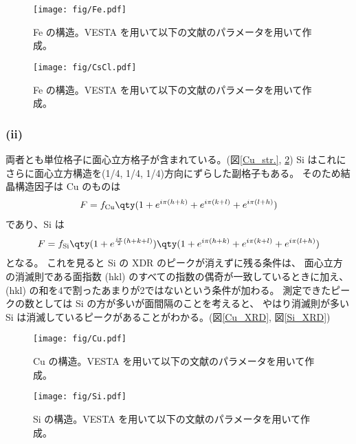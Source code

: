 \documentclass[11pt,dvipdfmx,a4paper]{jsarticle}
\begin{document}
\begin{figure}[H]
	\centering
	\begin{minipage}[t]{0.48\columnwidth}
		\centering
		\texttt{[image: fig/Fe.pdf]}
		\caption{Fe の構造。VESTA を用いて以下の文献のパラメータを用いて作成。\cite{cfi_Fe}}
		\label{Fe_str.}
	\end{minipage}
	\hfill
	\begin{minipage}[t]{0.48\columnwidth}
		\centering
		\texttt{[image: fig/CsCl.pdf]}
		\caption{Fe の構造。VESTA を用いて以下の文献のパラメータを用いて作成。\cite{cfi_CsCl}}
		\label{CsCl_str.}
	\end{minipage}
\end{figure}

\subsubsection*{(ii)}
両者とも単位格子に面心立方格子が含まれている。(図\ref{Cu_str.}, \ref{Si_str.})
Si はこれにさらに面心立方構造を(1/4, 1/4, 1/4)方向にずらした副格子もある。%
そのため結晶構造因子は Cu のものは
\begin{align}
	F = f_{\text{Cu}}\qty(1+e^{i\pi(h+k)}+e^{i\pi(k+l)}+e^{i\pi(l+h)})
\end{align}
であり、Si は
\begin{align}
	F = f_{\text{Si}}\qty(1+e^{\frac{i\pi}{2}(h+k+l)})\qty(1+e^{i\pi(h+k)}+e^{i\pi(k+l)}+e^{i\pi(l+h)})
\end{align}
となる。
これを見ると Si の XDR のピークが消えずに残る条件は、
面心立方の消滅則である面指数 (hkl) のすべての指数の偶奇が一致しているときに加え、
(hkl) の和を4で割ったあまりが2ではないという条件が加わる。
測定できたピークの数としては Si の方が多いが面間隔のことを考えると、
やはり消滅則が多い Si は消滅しているピークがあることがわかる。(図\ref{Cu_XRD}, 図\ref{Si_XRD})%

\begin{figure}[H]
	\centering
	\begin{minipage}[t]{0.48\columnwidth}
		\centering
		\texttt{[image: fig/Cu.pdf]}
		\caption{Cu の構造。VESTA を用いて以下の文献のパラメータを用いて作成。\cite{cfi_Cu}}
		\label{Cu_str.}
	\end{minipage}
	\hfill
	\begin{minipage}[t]{0.48\columnwidth}
		\centering
		\texttt{[image: fig/Si.pdf]}
		\caption{Si の構造。VESTA を用いて以下の文献のパラメータを用いて作成。\cite{cfi_Si}}
		\label{Si_str.}
	\end{minipage}
\end{figure}
\end{document}
